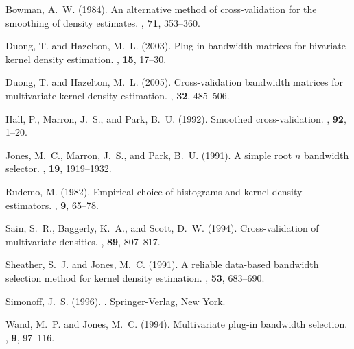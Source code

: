 \documentclass[a4paper,11pt]{article}
\begin{document}
\begin{thebibliography}{}
Bowman, A.~W. (1984).
\newblock An alternative method of cross-validation for the smoothing of
  density estimates.
, \textbf{71}, 353--360.

Duong, T. and Hazelton, M.~L. (2003).
\newblock Plug-in bandwidth matrices for bivariate kernel density estimation.
, \textbf{15}, 17--30.

Duong, T. and Hazelton, M.~L. (2005).
\newblock Cross-validation bandwidth matrices for multivariate kernel density
  estimation.
, \textbf{32}, 485--506.

Hall, P., Marron, J.~S., and Park, B.~U. (1992).
\newblock Smoothed cross-validation.
, \textbf{92}, 1--20.

Jones, M.~C., Marron, J.~S., and Park, B.~U. (1991).
\newblock A simple root $n$ bandwidth selector.
, \textbf{19}, 1919--1932.

Rudemo, M. (1982).
\newblock Empirical choice of histograms and kernel density estimators.
,
  \textbf{9}, 65--78.

Sain, S.~R., Baggerly, K.~A., and Scott, D.~W. (1994).
\newblock Cross-validation of multivariate densities.
, \textbf{89}, 807--817.

Sheather, S.~J. and Jones, M.~C. (1991).
\newblock A reliable data-based bandwidth selection method for kernel density
  estimation.
, \textbf{53}, 683--690.

Simonoff, J.~S. (1996).
.
\newblock Springer-Verlag, New York.

Wand, M.~P. and Jones, M.~C. (1994).
\newblock Multivariate plug-in bandwidth selection.
, \textbf{9}, 97--116.

\end{thebibliography}
\end{document}
